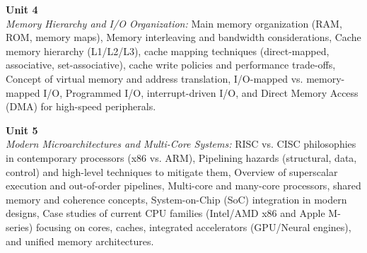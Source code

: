 \vspace{0.3cm}

\noindent\textbf{Unit 4} \\
\textit{Memory Hierarchy and I/O Organization:} Main memory organization (RAM, ROM, memory maps), Memory interleaving and bandwidth considerations, Cache memory hierarchy (L1/L2/L3), cache mapping techniques (direct-mapped, associative, set-associative), cache write policies and performance trade-offs, Concept of virtual memory and address translation, I/O-mapped vs. memory-mapped I/O, Programmed I/O, interrupt-driven I/O, and Direct Memory Access (DMA) for high-speed peripherals.

\vspace{0.3cm}

\noindent\textbf{Unit 5} \\
\textit{Modern Microarchitectures and Multi-Core Systems:} RISC vs. CISC philosophies in contemporary processors (x86 vs. ARM), Pipelining hazards (structural, data, control) and high-level techniques to mitigate them, Overview of superscalar execution and out-of-order pipelines, Multi-core and many-core processors, shared memory and coherence concepts, System-on-Chip (SoC) integration in modern designs, Case studies of current CPU families (Intel/AMD x86 and Apple M-series) focusing on cores, caches, integrated accelerators (GPU/Neural engines), and unified memory architectures.

\newpage
{}
